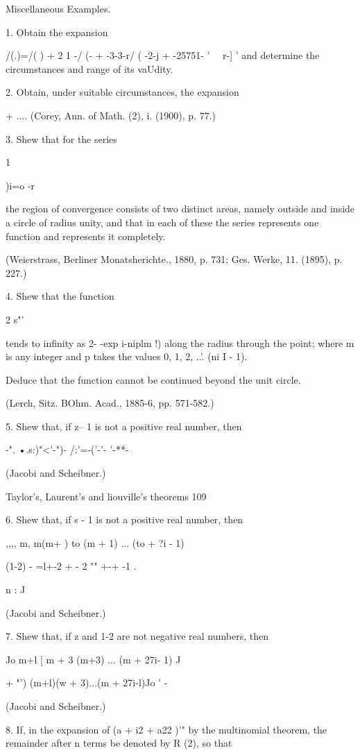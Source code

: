 {{{{Miscellaneous Examples.

1. Obtain the expansion

/(.)=/( ) + 2 1 -/ (- + -3-3-r/ ( -2-j + -25751- ' \ \ r-] ' and
determine the circumstances and range of its vaUdity.

2. Obtain, under suitable circumstances, the expansion

+ .... (Corey, Ann. of Math. (2), i. (1900), p. 77.)

3. Shew that for the series

  1

)i=o -r~

the region of convergence consists of two distinct areas, namely
outside and inside a circle of radius unity, and that in each of these
the series represents one function and represents it completely.

(Weierstrass, Berliner Monatsherichte., 1880, p. 731; Ges. Werke, 11.
(1895), p. 227.)

4. Shew that the function

2 s"'

tends to infinity as 2- -exp i-niplm !) along the radius through the
point; where m is any integer and p takes the values 0, 1, 2, ..'.
(ni I - 1).

Deduce that the function cannot be continued beyond the unit circle.

(Lerch, Sitz. BOhm. Acad., 1885-6, pp. 571-582.)

5. Shew that, if z-- 1 is not a positive real number, then

-". •.s:)"<'-")- /:'=-('-'- '-**-

(Jacobi and Scheibner.)

Taylor's, Laurent's and liouville's theorems 109

6. Shew that, if s - 1 is not a positive real number, then

,,,, m, m(m+ ) to (m + 1) ... (to + ?i - 1)

(1-2) - =l+-2 + - 2 "" +-+ -1 .

n : J

(Jacobi and Scheibner.)

7. Shew that, if z and 1-2 are not negative real numbers, then

  Jo m+l [ m + 3 (m+3) ... (m + 27i- 1) J

+ "') (m+l)(w + 3)...(m + 27i-l)Jo ' -

(Jacobi and Scheibner.)

8. If, in the expansion of (a + i2 + a22 )'" by the multinomial
theorem, the remainder after n terms be denoted by R (2), so that

}}}}

